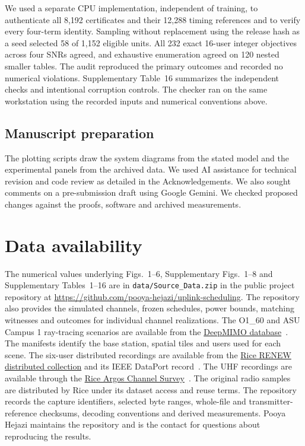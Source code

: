 \documentclass[lineno,pdflatex,sn-nature]{sn-jnl}
\begin{document}
We used a separate CPU implementation, independent of training, to authenticate all 8,192 certificates and their 12,288 timing references and to verify every four-term identity. Sampling without replacement using the release hash as a seed selected 58 of 1,152 eligible units. All 232 exact 16-user integer objectives across four SNRs agreed, and exhaustive enumeration agreed on 120 nested smaller tables. The audit reproduced the primary outcomes and recorded no numerical violations. Supplementary Table~16 summarizes the independent checks and intentional corruption controls. The checker ran on the same workstation using the recorded inputs and numerical conventions above.

\subsection*{Manuscript preparation}
The plotting scripts draw the system diagrams from the stated model and the experimental panels from the archived data. We used AI assistance for technical revision and code review as detailed in the Acknowledgements. We also sought comments on a pre-submission draft using Google Gemini. We checked proposed changes against the proofs, software and archived measurements.

\section*{Data availability}
The numerical values underlying Figs.~1--6, Supplementary Figs.~1--8 and Supplementary Tables~1--16 are in \nolinkurl{data/Source_Data.zip} in the public project repository at \url{https://github.com/pooya-hejazi/uplink-scheduling}. The repository also provides the simulated channels, frozen schedules, power bounds, matching witnesses and outcomes for individual channel realizations. The O1\_60 and ASU Campus 1 ray-tracing scenarios are available from the \href{https://www.deepmimo.net/}{DeepMIMO database}~\cite{deepmimo}. The manifests identify the base station, spatial tiles and users used for each scene. The six-user distributed recordings are available from the \href{https://renew.rice.edu/dataset-distributed.html}{Rice RENEW distributed collection} and its IEEE DataPort record~\cite{zafari}. The UHF recordings are available through the \href{https://renew.rice.edu/dataset-argos.html}{Rice Argos Channel Survey}~\cite{shepard}. The original radio samples are distributed by Rice under its dataset access and reuse terms. The repository records the capture identifiers, selected byte ranges, whole-file and transmitter-reference checksums, decoding conventions and derived measurements.
Pooya Hejazi maintains the repository and is the contact for questions about reproducing the results.
\end{document}
